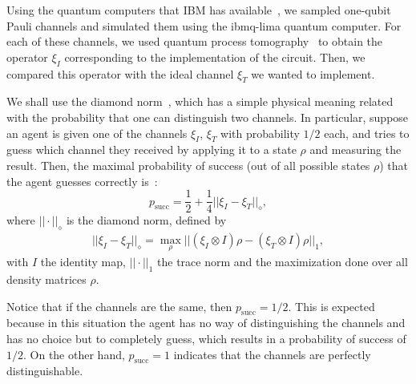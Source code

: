 \documentclass[10pt,letterpaper]{article} %
\renewcommand{\succ}{\textrm{succ}}
\begin{document}
Using the quantum computers that IBM has available~\cite{Qiskit}, we sampled
one-qubit Pauli channels and simulated them using the ibmq-lima quantum
computer.  For each of these channels, we used quantum process
tomography~\cite{Qiskit, Chuang:1996} to obtain the 
operator $\xi_I$ corresponding to the implementation of the
circuit.  Then, we compared this operator with the ideal 
channel $\xi_T$  we
wanted to implement.  


We shall use the diamond norm~\cite{Aharonov,Wilde}, which has a simple physical meaning related
with the probability that one can distinguish two channels.
In particular, suppose an agent is given one of the channels $\xi_I$, $\xi_T$
with probability $1/2$ each,
and tries to guess which channel they received
by applying it to a state $\rho$ and measuring the result.
Then, the maximal probability of success (out of all possible states $\rho$) that
the agent guesses correctly is~\cite{Benenti}:
\begin{equation}
\label{eq: probability-success}
p_{\succ} = \dfrac{1}{2}+ \dfrac{1}{4} ||\xi_I - \xi_T ||_{\diamond},
\end{equation}
where $|| \cdot ||_{\diamond}$ is the diamond norm, defined by 
\begin{align*}
||\xi_I - \xi_T ||_{\diamond}  = \max_{\rho} || (\xi_I \otimes I) \rho - (\xi_T \otimes I) \rho ||_1,
\end{align*}
with $I$ the identity map,
$|| \cdot ||_1$ the trace norm and the maximization
done over all density matrices $\rho$.
   
Notice that if the channels are the same, then $p_{\succ}=1/2$. 
This is expected because in this situation the agent
has no way of distinguishing the channels and has no choice but to completely
guess, which results in a probability of success of $1/2$.
On the other hand, $p_{\succ}=1$ indicates that the channels are perfectly
distinguishable.
\end{document}
